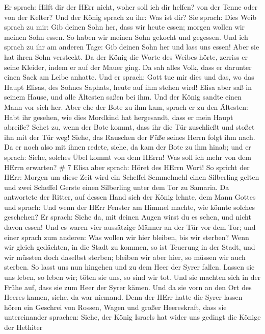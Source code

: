  Er sprach: Hilft dir der HErr nicht, woher soll ich dir
helfen? von der Tenne oder von der Kelter?  Und der König
sprach zu ihr: Was ist dir? Sie sprach: Dies Weib sprach zu mir: Gib
deinen Sohn her, dass wir heute essen; morgen wollen wir meinen Sohn
essen.  So haben wir meinen Sohn gekocht und gegessen. Und
ich sprach zu ihr am anderen Tage: Gib deinen Sohn her und lass uns
essen! Aber sie hat ihren Sohn versteckt.  Da der König die
Worte des Weibes hörte, zerriss er seine Kleider, indem er auf der Mauer
ging. Da sah alles Volk, dass er darunter einen Sack am Leibe anhatte.
 Und er sprach: Gott tue mir dies und das, wo das Haupt
Elisas, des Sohnes Saphats, heute auf ihm stehen wird! 
Elisa aber saß in seinem Hause, und alle Ältesten saßen bei ihm. Und der
König sandte einen Mann vor sich her. Aber ehe der Bote zu ihm kam,
sprach er zu den Ältesten: Habt ihr gesehen, wie dies Mordkind hat
hergesandt, dass er mein Haupt abreiße? Sehet zu, wenn der Bote kommt,
dass ihr die Tür zuschließt und stoßet ihn mit der Tür weg! Siehe, das
Rauschen der Füße seines Herrn folgt ihm nach.  Da er noch
also mit ihnen redete, siehe, da kam der Bote zu ihm hinab; und er
sprach: Siehe, solches Übel kommt von dem HErrn! Was soll ich mehr von
dem HErrn erwarten? \# 7  Elisa aber sprach: Höret des HErrn
Wort! So spricht der HErr: Morgen um diese Zeit wird ein Scheffel
Semmelmehl einen Silberling gelten und zwei Scheffel Gerste einen
Silberling unter dem Tor zu Samaria.  Da antwortete der
Ritter, auf dessen Hand sich der König lehnte, dem Mann Gottes und
sprach: Und wenn der HErr Fenster am Himmel machte, wie könnte solches
geschehen? Er sprach: Siehe da, mit deinen Augen wirst du es sehen, und
nicht davon essen!  Und es waren vier aussätzige Männer an
der Tür vor dem Tor; und einer sprach zum anderen: Was wollen wir hier
bleiben, bis wir sterben?  Wenn wir gleich gedächten, in die
Stadt zu kommen, so ist Teuerung in der Stadt, und wir müssten doch
daselbst sterben; bleiben wir aber hier, so müssen wir auch sterben. So
lasst uns nun hingehen und zu dem Heer der Syrer fallen. Lassen sie uns
leben, so leben wir; töten sie uns, so sind wir tot.  Und
sie machten sich in der Frühe auf, dass sie zum Heer der Syrer kämen.
Und da sie vorn an den Ort des Heeres kamen, siehe, da war niemand.
 Denn der HErr hatte die Syrer lassen hören ein Geschrei von
Rossen, Wagen und großer Heereskraft, dass sie untereinander sprachen:
Siehe, der König Israels hat wider uns gedingt die Könige der Hethiter
